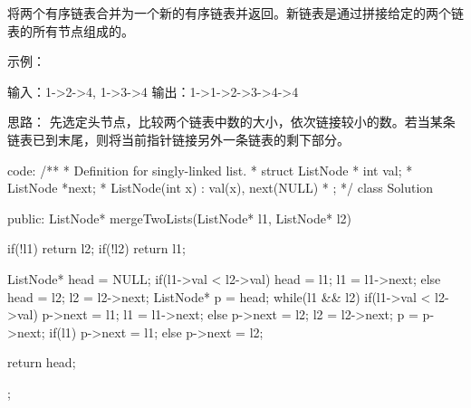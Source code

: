 将两个有序链表合并为一个新的有序链表并返回。新链表是通过拼接给定的两个链表的所有节点组成的。 

示例：

输入：1->2->4, 1->3->4
输出：1->1->2->3->4->4














思路：
先选定头节点，比较两个链表中数的大小，依次链接较小的数。若当某条链表已到末尾，则将当前指针链接另外一条链表的剩下部分。

















code:
/**
 * Definition for singly-linked list.
 * struct ListNode {
 *     int val;
 *     ListNode *next;
 *     ListNode(int x) : val(x), next(NULL) {}
 * };
 */
class Solution {
public:
    ListNode* mergeTwoLists(ListNode* l1, ListNode* l2) {
        if(!l1) return l2;
        if(!l2) return l1;
        
        ListNode* head = NULL;
        if(l1->val < l2->val)
        {
            head = l1; l1 = l1->next;
        }
        else
        {
            head = l2; l2 = l2->next;
        }
        ListNode* p = head;
        while(l1 && l2)
        {
            if(l1->val < l2->val)
            {
                p->next = l1; l1 = l1->next;
            }
            else
            {
                p->next = l2; l2 = l2->next;
            }
            p = p->next;
        }
        if(l1) p->next = l1;
        else p->next = l2;
        
        return head;
    }
};